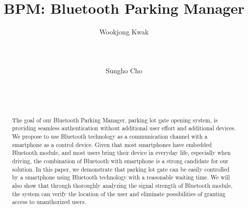 \documentclass{sig-alternate-ipsn13}
\begin{document}
\title{BPM: Bluetooth Parking Manager}


\author{
\alignauthor
Wookjong Kwak\\
       \\
       \\
       \\
\alignauthor
Sungho Cho\\
       \\
       \\
       \\
}

\maketitle
\begin{abstract}

The goal of our Bluetooth Parking Manager, parking lot gate opening system, is providing seamless authentication without additional user effort and additional devices. We propose to use Bluetooth technology as a communication channel with a smartphone as a control device. Given that most smartphones have embedded Bluetooth module, and most users bring their device in everyday life, especially when driving, the combination of Bluetooth with smartphone is a strong candidate for our solution. In this paper, we demonstrate that parking lot gate can be easily controlled by a smartphone using Bluetooth technology with a reasonable waiting time. We will also show that through thoroughly analyzing the signal strength of Bluetooth module, the system can verify the location of the user and eliminate possibilities of granting access to unauthorized users.

\end{abstract}










%

%
%


\end{document}
